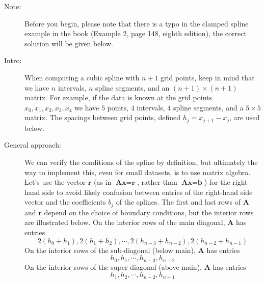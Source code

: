 \documentclass[12pt]{article}
\begin{document}
\begin{description}
\item[Note:] Before you begin, please note that there is a typo in the clamped spline example in the book (Example 2, page 148, eighth edition), the correct solution will be given below.

\item[Intro:] When computing a cubic spline with \(n+1\) grid points, keep in mind that we have \(n\) intervals, \(n\) spline segments, and an \((n+1)\times (n+1)\) matrix.  For example, if the data is known at the grid points \(x_0, x_1, x_2, x_3, x_4\) we have \(5\) points, \(4\) intervals, \(4\) spline segments, and a \(5\times5\) matrix.  The spacings between grid points, defined \(h_j = x_{j+1} - x_j\), are used below.

\item[General approach:] We can verify the conditions of the spline by definition, but ultimately the way to implement this, even for small datasets, is to use matrix algebra.  Let's use the vector \(\mathbf{r}\) (as in \(\textbf{A}\textbf{x} = \textbf{r}\), rather than \(\textbf{A}\textbf{x} = \textbf{b}\)) for the right-hand side to avoid likely confusion between entries of the right-hand side vector and the coefficients \(b_j\) of the splines. The first and last rows of \(\mathbf{A}\) and \(\mathbf{r}\) depend on the choice of boundary conditions, but the interior rows are illustrated below. On the interior rows of the main diagonal, \(\mathbf{A}\) has entries \[2(h_0+h_1), 2(h_1 + h_2), \cdots, 2(h_{n-3} + h_{n-2}), 2(h_{n-2} + h_{n-1})\] On the interior rows of the sub-diagonal (below main), \(\mathbf{A}\) has entries \[h_0, h_1, \cdots, h_{n-3}, h_{n-2}\] On the interior rows of the super-diagonal (above main), \(\mathbf{A}\) has entries \[h_1, h_2, \cdots, h_{n-2}, h_{n-1}\] 


\end{description}
\end{document}

